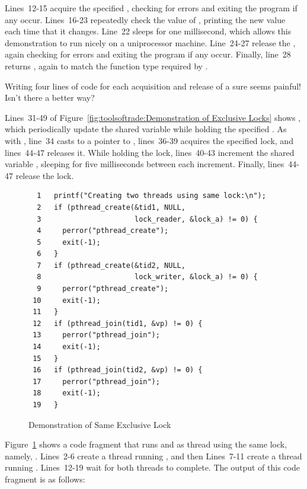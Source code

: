 Lines~12-15 acquire the specified , checking
for errors and exiting the program if any occur.
Lines~16-23 repeatedly check the value of , printing the new value
each time that it changes.
Line~22 sleeps for one millisecond, which allows this demonstration
to run nicely on a uniprocessor machine.
Line~24-27 release the , again checking for
errors and exiting the program if any occur.
Finally, line~28 returns , again to match the function type
required by .

\QuickQuiz{}
	Writing four lines of code for each acquisition and release
	of a  sure seems painful!
	Isn't there a better way?
 \QuickQuizEnd

Lines~31-49 of
Figure~\ref{fig:toolsoftrade:Demonstration of Exclusive Locks}
shows , which
periodically update the shared variable  while holding the
specified .
As with , line~34 casts  to a pointer
to , lines~36-39 acquires the specified lock,
and lines~44-47 releases it.
While holding the lock, lines~40-43 increment the shared variable ,
sleeping for five milliseconds between each increment.
Finally, lines~44-47 release the lock.

\begin{figure}[tbp]
{ \scriptsize
\begin{verbatim}
  1   printf("Creating two threads using same lock:\n");
  2   if (pthread_create(&tid1, NULL,
  3                      lock_reader, &lock_a) != 0) {
  4     perror("pthread_create");
  5     exit(-1);
  6   }
  7   if (pthread_create(&tid2, NULL,
  8                      lock_writer, &lock_a) != 0) {
  9     perror("pthread_create");
 10     exit(-1);
 11   }
 12   if (pthread_join(tid1, &vp) != 0) {
 13     perror("pthread_join");
 14     exit(-1);
 15   }
 16   if (pthread_join(tid2, &vp) != 0) {
 17     perror("pthread_join");
 18     exit(-1);
 19   }
\end{verbatim}
}
\caption{Demonstration of Same Exclusive Lock}
\label{fig:toolsoftrade:Demonstration of Same Exclusive Lock}
\end{figure}

Figure~\ref{fig:toolsoftrade:Demonstration of Same Exclusive Lock}
shows a code fragment that runs  and
 as thread using the same lock, namely, .
Lines~2-6 create a thread running , and then
Lines~7-11 create a thread running .
Lines~12-19 wait for both threads to complete.
The output of this code fragment is as follows:

